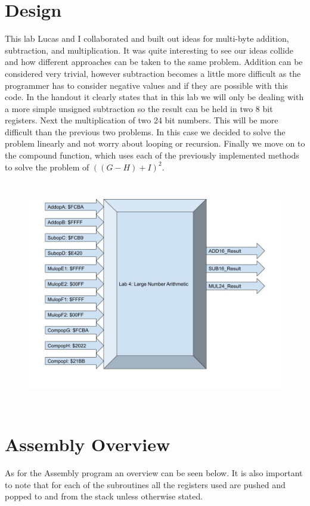 \documentclass[12pt,letterpaper]{article}
\begin{document}
\section{Design}
This lab Lucas and I collaborated and built out ideas for multi-byte addition, subtraction, and multiplication. It was quite interesting to see our ideas collide and how different approaches can be taken to the same problem. Addition can be considered very trivial, however subtraction becomes a little more difficult as the programmer has to consider negative values and if they are possible with this code. In the handout it clearly states that in this lab we will only be dealing with a more simple unsigned subtraction so the result can be held in two 8 bit registers. Next the multiplication of two 24 bit numbers. This will be more difficult than the previous two problems. In this case we decided to solve the problem linearly and not worry about looping or recursion. Finally we move on to the compound function, which uses each of the previously implemented methods to solve the problem of \(((G-H)+I)^2\). 

\begin{figure}[h]
	\includegraphics[width=12cm, height=10cm]{BlockDiagram L4.jpg}
	\centering
\end{figure}
	
\section{Assembly Overview}
As for the Assembly program an overview can be seen below. It is also important to note that for each of the subroutines all the registers used are pushed and popped to and from the stack unless otherwise stated.
\end{document}
